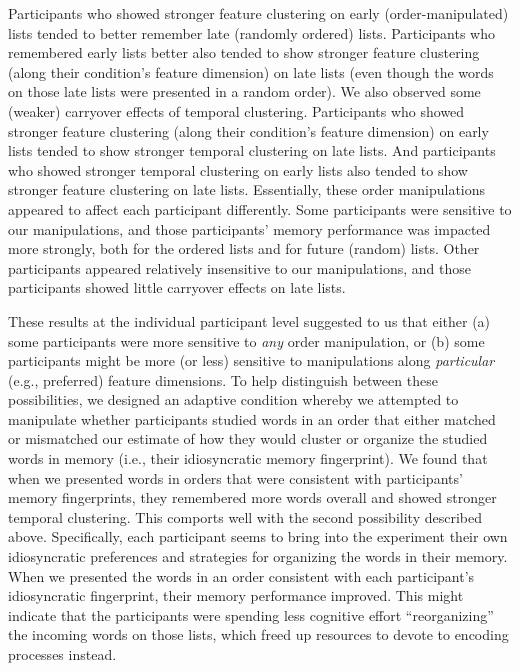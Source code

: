 \documentclass[11pt]{article}
\begin{document}
Participants who showed stronger feature clustering on early
(order-manipulated) lists tended to better remember late (randomly ordered)
lists. Participants who remembered early lists better also tended to show
stronger feature clustering (along their condition's feature dimension) on late
lists (even though the words on those late lists were presented in a random
order). We also observed some (weaker) carryover effects of temporal
clustering. Participants who showed stronger feature clustering (along their
condition's feature dimension) on early lists tended to show stronger temporal
clustering on late lists. And participants who showed stronger temporal
clustering on early lists also tended to show stronger feature clustering on
late lists. Essentially, these order manipulations appeared to affect each
participant differently. Some participants were sensitive to our manipulations,
and those participants' memory performance was impacted more strongly, both for
the ordered lists and for future (random) lists. Other participants appeared
relatively insensitive to our manipulations, and those participants showed
little carryover effects on late lists.

These results at the individual participant level suggested to us that either
(a) some participants were more sensitive to \textit{any} order manipulation,
or (b) some participants might be more (or less) sensitive to manipulations
along \textit{particular} (e.g., preferred) feature dimensions. To help
distinguish between these possibilities, we designed an adaptive condition
whereby we attempted to manipulate whether participants studied words in an
order that either matched or mismatched our estimate of how they would cluster
or organize the studied words in memory (i.e., their idiosyncratic memory
fingerprint). We found that when we presented words in orders that were
consistent with participants' memory fingerprints, they remembered more words
overall and showed stronger temporal clustering. This comports well with the
second possibility described above. Specifically, each participant seems to
bring into the experiment their own idiosyncratic preferences and strategies
for organizing the words in their memory. When we presented the words in an
order consistent with each participant's idiosyncratic fingerprint, their
memory performance improved. This might indicate that the participants were
spending less cognitive effort ``reorganizing'' the incoming words on those
lists, which freed up resources to devote to encoding processes instead.
\end{document}
